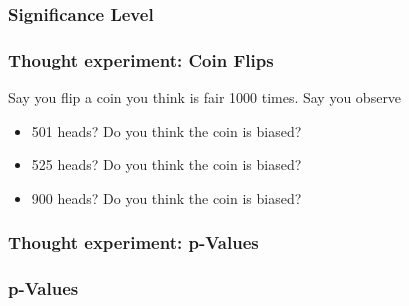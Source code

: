 \documentclass[handout]{beamer}
\newcommand{\blue}[1]{\textcolor{blue2}{#1}}
\begin{document}
\begin{frame}
\frametitle{Significance Level}

%
%
%
%

\end{frame}


\begin{frame}
\frametitle{Thought experiment: Coin Flips}
Say you flip a coin you think is fair 1000 times.  Say you observe
\begin{itemize}
\pause \item 501 heads? Do you think the coin is biased?
\pause \item 525 heads? Do you think the coin is biased?
\pause \item 900 heads? Do you think the coin is biased?
\end{itemize}

\end{frame}


\begin{frame}
\frametitle{Thought experiment: p-Values}
%
%
%  
%
%
%

\end{frame}


\begin{frame}
\frametitle{p-Values}
%
%
%
%

\end{frame}
\end{document}
